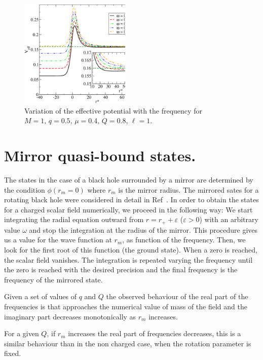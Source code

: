\documentclass[aps, prd, twocolumn, amsmath, floats,floatfix, superscriptaddress,
nofootinbib, showpacs]{revtex4-1}
\begin{document}
\begin{figure}[!ht]
\includegraphics[width=0.47\textwidth]{m0.4_Q0.8_q0.5_ws.eps}
\caption{Variation of the effective potential with the frequency for $M=1,\,q=0.5,\,
\mu=0.4 ,\, Q=0.8$, $\ell=1$.}
\label{fig:pot_w}
\end{figure}

\section{Mirror quasi-bound states.}
\label{sec:Mbound-states}
The states in the case of a black hole surrounded by a mirror are determined by the condition 
$\phi(r_{m}=0)$ where $r_{m}$ is the mirror radius. The mirrored sates for a rotating black hole
were considered in detail in Ref~\cite{Cardoso:2004nk}.
In order to obtain the states for a charged scalar field numerically, we proceed in the following
way:
We start
integrating the radial equation outward from
$r=r_{+}+\varepsilon$ ($\varepsilon>0$) with an arbitrary value $\omega$ and stop the integration at
the radius of the
mirror. 
This procedure gives us a value for the wave function at $r_m$, as function
of the frequency. Then, we look for the first root of this function (the ground state). When a
zero is reached, the scalar field vanishes. The integration is repeated varying the frequency until
the zero is reached with the desired precision and the final frequency is the frequency of the
mirrored state. 

Given a set of values of $q$ and $Q$ the observed behaviour of the real part of the frequencies is
that approaches the numerical value of mass of the field  and the imaginary part decreases
monotonically as $r_m$ increases.

For a given $Q$, if $r_m$ increases the real part of frequencies decreases, this is
a similar behaviour than in the non charged case, when the rotation parameter is fixed.
\end{document}
